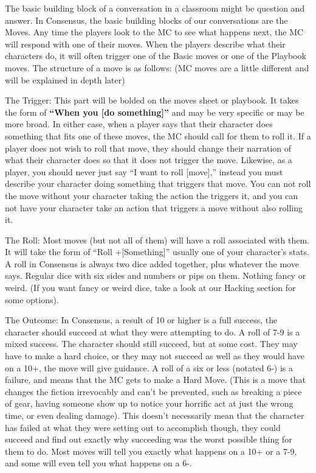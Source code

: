 \documentclass[
  oneside,
  statementpaper,
  9pt]{memoir}
\begin{document}
The basic building block of a conversation in a classroom might be
question and answer. In Consensus, the basic building blocks of our
conversations are the Moves. Any time the players look to the MC to see
what happens next, the MC will respond with one of their moves. When the
players describe what their characters do, it will often trigger one of
the Basic moves or one of the Playbook moves. The structure of a move is
as follows: (MC moves are a little different and will be explained in
depth later)

The Trigger: This part will be bolded on the moves sheet or playbook. It
takes the form of \textbf{``When you {[}do something{]}''} and may be
very specific or may be more broad. In either case, when a player says
that their character does something that fits one of these moves, the MC
should call for them to roll it. If a player does not wish to roll that
move, they should change their narration of what their character does so
that it does not trigger the move. Likewise, as a player, you should
never just say ``I want to roll {[}move{]},'' instead you must describe
your character doing something that triggers that move. You can not roll
the move without your character taking the action the triggers it, and
you can not have your character take an action that triggers a move
without also rolling it.

The Roll: Most moves (but not all of them) will have a roll associated
with them. It will take the form of ``Roll +{[}Something{]}'' usually
one of your character's stats. A roll in Consensus is always two dice
added together, plus whatever the move says. Regular dice with six sides
and numbers or pips on them. Nothing fancy or weird. (If you want fancy
or weird dice, take a look at our Hacking section for some options).

The Outcome: In Consensus, a result of 10 or higher is a full success,
the character should succeed at what they were attempting to do. A roll
of 7-9 is a mixed success. The character should still succeed, but at
some cost. They may have to make a hard choice, or they may not succeed
as well as they would have on a 10+, the move will give guidance. A roll
of a six or less (notated 6-) is a failure, and means that the MC gets
to make a Hard Move. (This is a move that changes the fiction
irrevocably and can't be prevented, such as breaking a piece of gear,
having someone show up to notice your horrific act at just the wrong
time, or even dealing damage). This doesn't necessarily mean that the
character has failed at what they were setting out to accomplish though,
they could succeed and find out exactly why succeeding was the worst
possible thing for them to do. Most moves will tell you exactly what
happens on a 10+ or a 7-9, and some will even tell you what happens on a
6-.
\end{document}
